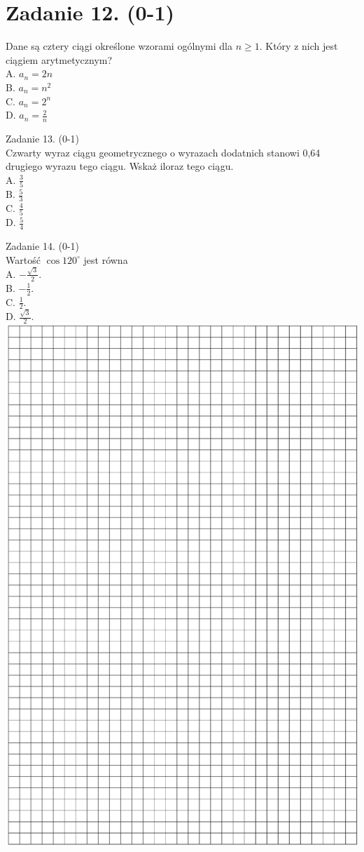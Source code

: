 \documentclass[10pt]{article}
\begin{document}
\section*{Zadanie 12. (0-1)}
Dane są cztery ciągi określone wzorami ogólnymi dla \(n \geqslant 1\). Który z nich jest ciągiem arytmetycznym?\\
A. \(a_{n}=2 n\)\\
B. \(a_{n}=n^{2}\)\\
C. \(a_{n}=2^{n}\)\\
D. \(a_{n}=\frac{2}{n}\)

Zadanie 13. (0-1)\\
Czwarty wyraz ciągu geometrycznego o wyrazach dodatnich stanowi 0,64 drugiego wyrazu tego ciągu. Wskaż iloraz tego ciągu.\\
A. \(\frac{3}{5}\)\\
B. \(\frac{5}{3}\)\\
C. \(\frac{4}{5}\)\\
D. \(\frac{5}{4}\)

Zadanie 14. (0-1)\\
Wartość \(\cos 120^{\circ}\) jest równa\\
A. \(-\frac{\sqrt{3}}{2}\).\\
B. \(-\frac{1}{2}\).\\
C. \(\frac{1}{2}\).\\
D. \(\frac{\sqrt{3}}{2}\).\\
\includegraphics[max width=\textwidth, center]{2024_11_21_1e89351873aa60c4c1b9g-05}
\end{document}
